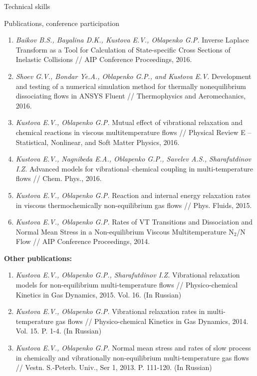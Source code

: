 \documentclass{resume} %
\begin{document}
\begin{rSection}{Technical skills}
\begin{rSection}{Publications, conference participation}
\begin{enumerate}
\item  \emph{Baikov B.S., Bayalina D.K., Kustova E.V., Oblapenko G.P.} Inverse Laplace Transform as a Tool for Calculation of State-specific Cross Sections of Inelastic Collisions // AIP Conference Proceedings, 2016.

\item  \emph{Shoev G.V., Bondar Ye.A., Oblapenko G.P., and Kustova E.V.} Development and testing of a numerical simulation method for thermally nonequilibrium dissociating flows in ANSYS Fluent // Thermophysics and Aeromechanics, 2016.

\item  \emph{Kustova E.V., Oblapenko G.P.} Mutual effect of vibrational relaxation and chemical reactions in viscous multitemperature flows // Physical Review E -- Statistical, Nonlinear, and Soft Matter Physics, 2016.

\item  \emph{Kustova E.V., Nagnibeda E.A., Oblapenko G.P., Savelev A.S., Sharafutdinov I.Z.} Advanced models for vibrational–chemical coupling in multi-temperature flows // Chem. Phys., 2016.

\item  \emph{Kustova E.V., Oblapenko G.P.} Reaction and internal energy relaxation rates in viscous thermochemically non-equilibrium gas flows // Phys. Fluids, 2015.

\item  \emph{Kustova E.V., Oblapenko G.P.} Rates of VT Transitions and Dissociation and Normal Mean Stress in a Non-equilibrium Viscous Multitemperature N$_2$/N Flow // AIP Conference Proceedings, 2014.


\end{enumerate}


{\bf Other publications:}

\begin{enumerate}
    \item  \emph{Kustova E.V., Oblapenko G.P., Sharafutdinov I.Z.} Vibrational relaxation models for non-equilibrium multi-temperature flows // Physico-chemical Kinetics in Gas Dynamics, 2015. Vol. 16. (In Russian)

    \item  \emph{Kustova E.V., Oblapenko G.P.} Vibrational relaxation rates in multi-temperature gas flows // Physico-chemical Kinetics in Gas Dynamics, 2014. Vol. 15. P. 1-4. (In Russian)

    \item  \emph{Kustova E.V., Oblapenko G.P.} Normal mean stress and rates of slow process in chemically and vibrationally non-equilibrium multi-temperature gas flows // Vestn. S.-Peterb. Univ., Ser 1, 2013. P. 111-120. (In Russian)
\end{enumerate}


\end{rSection}
\end{rSection}
\end{document}
